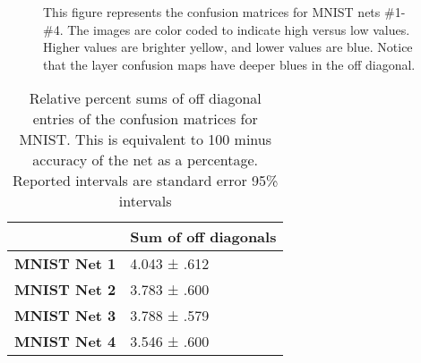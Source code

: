 \begin{figure}[ht]
	\centering
	
	\caption[Confusion matrices for MNIST nets \#1-\#4]{This figure represents the confusion matrices for MNIST nets \#1-\#4.  The images are color coded to indicate high versus low values.  Higher values are brighter yellow, and lower values are blue. Notice that the \RS layer confusion maps have deeper blues in the off diagonal.}
	\label{fig:benfordconfusionstikz}
\end{figure}

\begin{table}[ht]
	\renewcommand{\arraystretch}{1.4}
	\centering
\begin{tabular}{l|l|}
	\cline{2-2}
	& \textbf{Sum of off diagonals} \\ \hline
	\multicolumn{1}{|l|}{\textbf{MNIST Net 1}} & 4.043 ± .612                  \\ \hline
	\multicolumn{1}{|l|}{\textbf{MNIST Net 2}} & 3.783 ± .600                  \\ \hline
	\multicolumn{1}{|l|}{\textbf{MNIST Net 3}} & 3.788 ± .579                  \\ \hline
	\multicolumn{1}{|l|}{\textbf{MNIST Net 4}} & 3.546 ± .600                  \\ \hline
\end{tabular}
	\caption[Accuracy of MNIST training with imbalanced data]{Relative percent sums of off diagonal entries of the confusion matrices for MNIST. This is equivalent to 100 minus accuracy of the net as a percentage. Reported intervals are standard error 95\% intervals}
\end{table}

